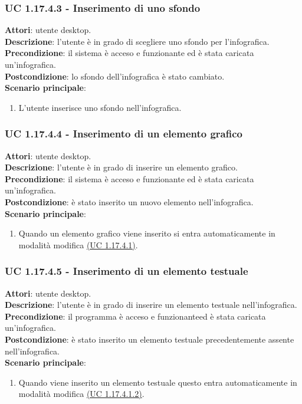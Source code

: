\subsubsection{UC 1.17.4.3 - Inserimento di uno sfondo}{
	\label{uc1.17.4.3}
	\textbf{Attori}: utente desktop. \\
	\textbf{Descrizione}: l'utente è in grado di scegliere uno sfondo per l'infografica. \\
	\textbf{Precondizione}: il sistema è acceso e funzionante ed è stata caricata un'infografica.	\\
	\textbf{Postcondizione}: lo sfondo dell'infografica è stato cambiato.\\
	\textbf{Scenario principale}:
	\begin{enumerate}
		\item L'utente inserisce uno sfondo nell'infografica.
	\end{enumerate}			
	}
\subsubsection{UC 1.17.4.4 - Inserimento di un elemento grafico}{
	\label{uc1.17.4.4}
	\textbf{Attori}: utente desktop. \\
	\textbf{Descrizione}: l'utente è in grado di inserire un elemento grafico. \\
	\textbf{Precondizione}: il sistema è acceso e funzionante ed è stata caricata un'infografica.	\\
	\textbf{Postcondizione}: è stato inserito un nuovo elemento nell'infografica.\\
	\textbf{Scenario principale}:
	\begin{enumerate}
		\item Quando un elemento grafico viene inserito si entra automaticamente in modalità modifica \hyperref[uc1.17.4.1]{(UC 1.17.4.1)}.
	\end{enumerate}
	}
\subsubsection{UC 1.17.4.5 - Inserimento di un elemento testuale}{
	\label{uc1.17.4.5}
	\textbf{Attori}: utente desktop. \\
	\textbf{Descrizione}: l'utente è in grado di inserire un elemento testuale nell'infografica. \\
	\textbf{Precondizione}: il programma è acceso e funzionanteed è stata caricata un'infografica.	\\
	\textbf{Postcondizione}: è stato inserito un elemento testuale precedentemente assente nell'infografica.	\\
	\textbf{Scenario principale}:
	\begin{enumerate}
		\item Quando viene inserito un elemento testuale questo entra automaticamente in modalità modifica \hyperref[uc1.17.4.1.2]{(UC 1.17.4.1.2)}.
	\end{enumerate}
	}
